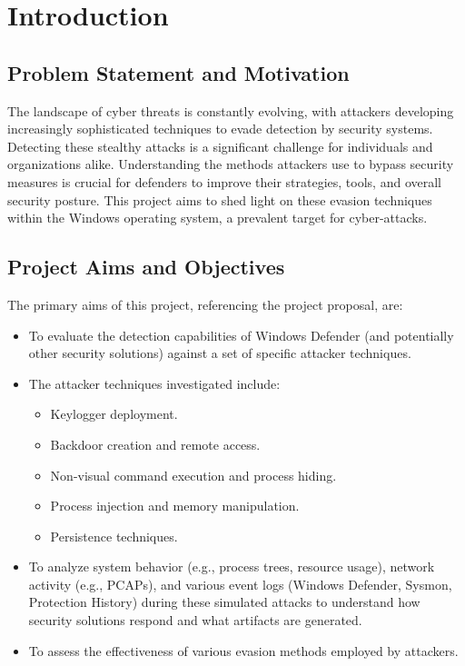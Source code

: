 \documentclass[11pt]{article}
\begin{document}
	\section{Introduction}
	\subsection{Problem Statement and Motivation}
	The landscape of cyber threats is constantly evolving, with attackers developing increasingly sophisticated techniques to evade detection by security systems. Detecting these stealthy attacks is a significant challenge for individuals and organizations alike. Understanding the methods attackers use to bypass security measures is crucial for defenders to improve their strategies, tools, and overall security posture. This project aims to shed light on these evasion techniques within the Windows operating system, a prevalent target for cyber-attacks.
	
	\subsection{Project Aims and Objectives}
	The primary aims of this project, referencing the project proposal, are:
	\begin{itemize}
		\item To evaluate the detection capabilities of Windows Defender (and potentially other security solutions) against a set of specific attacker techniques.
		\item The attacker techniques investigated include:
		\begin{itemize}
			\item Keylogger deployment.
			\item Backdoor creation and remote access.
			\item Non-visual command execution and process hiding.
			\item Process injection and memory manipulation.
			\item Persistence techniques.
		\end{itemize}
		\item To analyze system behavior (e.g., process trees, resource usage), network activity (e.g., PCAPs), and various event logs (Windows Defender, Sysmon, Protection History) during these simulated attacks to understand how security solutions respond and what artifacts are generated.
		\item To assess the effectiveness of various evasion methods employed by attackers.
	\end{itemize}
	
\end{document}
